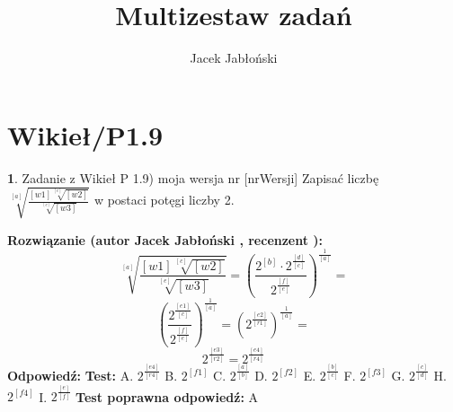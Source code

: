 \documentclass[12pt, a4paper]{article}
\title{Multizestaw zadań}
\author{Jacek Jabłoński}
\date{}
\theoremstyle{definition} %
\newtheorem{zad}{}
\newcommand{\kategoria}[1]{\section{#1}} %
\newcommand{\zadStart}[1]{\begin{zad}#1\newline} %
\newcommand{\zadStop}{\end{zad}}   %
\newcommand{\rozwStart}[2]{\noindent \textbf{Rozwiązanie (autor #1 , recenzent #2): }\newline} %
\newcommand{\rozwStop}{\newline}                                            %
\newcommand{\odpStart}{\noindent \textbf{Odpowiedź:}\newline}    %
\newcommand{\odpStop}{\newline}                                             %
\newcommand{\testStart}{\noindent \textbf{Test:}\newline} %
\newcommand{\testStop}{\newline} %
\newcommand{\kluczStart}{\noindent \textbf{Test poprawna odpowiedź:}\newline} %
\newcommand{\kluczStop}{\newline} %
\begin{document}
\maketitle


\kategoria{Wikieł/P1.9}
\zadStart{Zadanie z Wikieł P 1.9) moja wersja nr [nrWersji]}
Zapisać liczbę $\sqrt[[a]]{\frac{[w1] \sqrt[[c]]{[w2]}}{\sqrt[[e]]{[w3]}}}$ w postaci potęgi liczby 2.
\zadStop
\rozwStart{Jacek Jabłoński}{}
$$\sqrt[[a]]{\frac{[w1] \sqrt[[c]]{[w2]}}{\sqrt[[e]]{[w3]}}} = (\frac{2^{[b]} \cdot 2^{\frac{[d]}{[c]}}}{2^{\frac{[f]}{[e]}}})^{\frac{1}{[a]}} = $$
$$(\frac{2^{\frac{[e1]}{[c]}}}{2^{\frac{[f]}{[e]}}})^{\frac{1}{[a]}} = (2^{\frac{[e2]}{[r1]}})^{\frac{1}{[a]}} = $$
$$2^{\frac{[e3]}{[r2]}} = 2^{\frac{[e4]}{[r4]}}$$
\rozwStop
\odpStart
\odpStop
\testStart
A. $2^{\frac{[e4]}{[r4]}}$
B. $2^{[f1]}$
C. $2^{\frac{[a]}{[b]}}$
D. $2^{[f2]}$
E. $2^{\frac{[b]}{[c]}}$
F. $2^{[f3]}$
G. $2^{\frac{[c]}{[d]}}$
H. $2^{[f4]}$
I. $2^{\frac{[e]}{[f]}}$
\testStop
\kluczStart
A
\kluczStop
\end{document}
